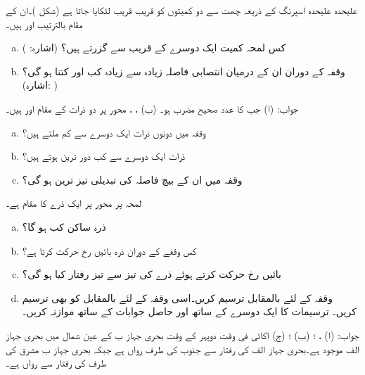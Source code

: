 علیحدہ علیحدہ اسپرنگ کے ذریعہ چھت سے دو کمیتوں کو قریب قریب لٹکایا جاتا ہے (شکل )۔ان کے مقام بالترتیب  اور  ہیں۔
\begin{enumerate}[a.]
\item
کس لمحہ کمیت ایک دوسرے کے قریب سے گزرتے ہیں؟ (اشارہ: )
\item
وقفہ  کے دوران ان کے درمیان انتصابی فاصلہ زیادہ سے زیادہ کب اور کتنا ہو گی؟ \\(اشارہ: ) 
\end{enumerate} 
جواب:\quad
(ا) جب  کا عدد صحیح مضرب  ہو۔  (ب) ، ، 
 محور پر دو ذرات کے مقام  اور  ہیں۔
\begin{enumerate}[a.]
\item
وقفہ  میں دونوں ذرات ایک دوسرے سے کم ملتے ہیں؟
\item
ذرات ایک دوسرے سے کب دور ترین ہوتے ہیں؟
\item
وقفہ  میں ان کے بیچ فاصلہ کی تبدیلی تیز ترین ہو گی؟
\end{enumerate}
لمحہ  پر  محور پر ایک ذرے کا مقام  ہے۔
\begin{enumerate}[a.]
\item
ذرہ ساکن کب ہو گا؟
\item
کس وقفے کے دوران ذرہ بائیں رخ حرکت کرتا ہے؟
\item
بائیں رخ حرکت کرتے ہوئے ذرے کی تیز سے تیز رفتار کیا ہو گی؟
\item
وقفہ  کے لئے  بالمقابل  ترسیم کریں۔اسی وقفہ کے لئے  بالمقابل  کو بھی ترسیم کریں۔ ترسیمات کا ایک دوسرے کے ساتھ اور حاصل جوابات کے ساتھ موازنہ کریں۔
\end{enumerate}
جواب:\quad
(ا) ، ؛ (ب) ؛ (ج)  اکائی فی وقت
دوپہر کے وقت   بحری جہاز ب کے عین شمال میں بحری جہاز الف موجود ہے۔بحری جہاز الف  کی رفتار سے جنوب کی طرف رواں ہے جبکہ بحری جہاز ب مشرق کی طرف  کی رفتار سے رواں ہے۔

